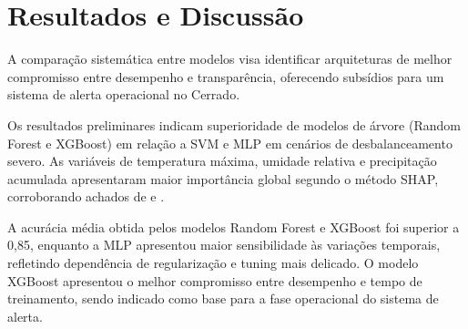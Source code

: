 
\chapter{Resultados e Discussão}

A comparação sistemática entre modelos visa identificar arquiteturas de melhor compromisso entre desempenho e transparência, oferecendo subsídios para um sistema de alerta operacional no Cerrado.

Os resultados preliminares indicam superioridade de modelos de árvore (Random Forest e XGBoost) em relação a SVM e MLP em cenários de desbalanceamento severo. As variáveis de temperatura máxima, umidade relativa e precipitação acumulada apresentaram maior importância global segundo o método SHAP, corroborando achados de \cite{freitas2025xingu} e \cite{giuseppe2025global}.

A acurácia média obtida pelos modelos Random Forest e XGBoost foi superior a 0,85, enquanto a MLP apresentou maior sensibilidade às variações temporais, refletindo dependência de regularização e tuning mais delicado. O modelo XGBoost apresentou o melhor compromisso entre desempenho e tempo de treinamento, sendo indicado como base para a fase operacional do sistema de alerta.
